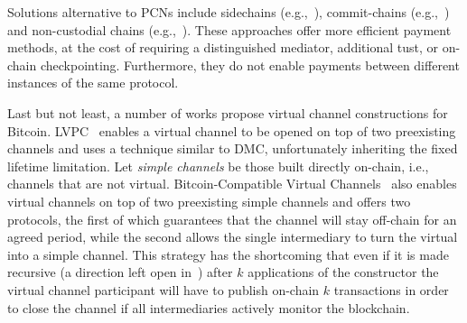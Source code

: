   Solutions alternative to PCNs include side\-chains
  (e.g.,~\cite{BCDF+14,sidechains,KiaZin18}), commit-chains
  (e.g.,~\cite{plasma}) and non-cu\-sto\-di\-al chains
  (e.g.,~\cite{plasma,konstantopoulos2019plasma,plasma-lower-bounds}). These
  approaches offer more efficient payment methods, at the cost of
  requiring a distinguished mediator, additional tust, or on-chain
  checkpointing. Furthermore, they do not enable payments between different instances
  of the same protocol.

  Last but not least, a number of works propose virtual channel constructions
  for Bitcoin. LVPC~\cite{10.1007/978-3-030-65411-5_18} enables a virtual channel to be
  opened on top of two preexisting channels and uses a technique similar to DMC,
  unfortunately inheriting the fixed lifetime limitation.
  Let \emph{simple channels} be those built directly on-chain, i.e., channels that are not
  virtual.
  Bitcoin-Compatible Virtual Channels~\cite{9519487} also enables
  virtual channels on top of two preexisting simple channels
  and offers two protocols, the first of which guarantees that the channel will
  stay off-chain for an agreed period, while the second allows the single intermediary
  to turn the virtual into a simple channel.
  This strategy has the shortcoming that even if it is made
  recursive (a direction left open in~\cite{9519487}) after $k$
  applications of the constructor the virtual channel participant will have to
  publish on-chain $k$ transactions in order to close the channel if all
  intermediaries actively monitor the blockchain.

